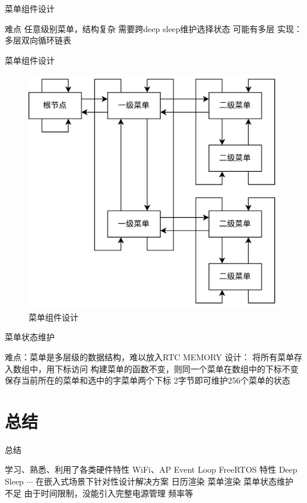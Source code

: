 \documentclass{ctexbeamer}
\begin{document}
\begin{frame}{菜单组件设计}
    \begin{outline}
        \1 难点
            \2 任意级别菜单，结构复杂
            \2 需要跨deep sleep维护选择状态
                \3 可能有多层
        \1 实现：多层双向循环链表
    \end{outline}
\end{frame}
\begin{frame}{菜单组件设计}
    \begin{figure}[htp]
        \centering
        \includegraphics[width=.7\linewidth]{menu.drawio.png}
        \caption{菜单组件设计}
      \end{figure}
\end{frame}
\begin{frame}{菜单状态维护}
    \begin{outline}
        \1 难点：菜单是多层级的数据结构，难以放入RTC MEMORY
        \1 设计：
            \2 将所有菜单存入数组中，用下标访问
            \2 构建菜单的函数不变，则同一个菜单在数组中的下标不变
            \2 保存当前所在的菜单和选中的字菜单两个下标
            \2 2字节即可维护256个菜单的状态
    \end{outline}
\end{frame}
\section{总结}
\begin{frame}{总结}
    \begin{outline}
        \1 学习、熟悉、利用了各类硬件特性
            \2 WiFi、AP
            \2 Event Loop
            \2 FreeRTOS 特性
            \2 Deep Sleep
            \2 $\cdots$
        \1 在嵌入式场景下针对性设计解决方案
            \2 日历渲染
            \2 菜单渲染
            \2 菜单状态维护
        \1 不足
            \2 由于时间限制，没能引入完整电源管理
                \3 频率等
            
    \end{outline}
\end{frame}
\end{document}
